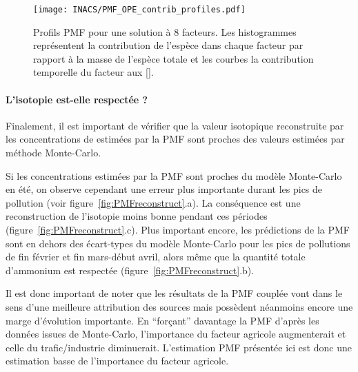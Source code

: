 \begin{figure}[ht]
    \centering
    \texttt{[image: INACS/PMF\_OPE\_contrib\_profiles.pdf]}
    \caption{
        Profils PMF pour une solution à 8 facteurs. Les histogrammes représentent la
        contribution de l'espèce dans chaque facteur par rapport à la masse de l'espèce
        totale et les courbes la contribution temporelle du facteur aux \PMdc{} [\si{\ugm}].
    }
    \label{fig:PMF}
\end{figure}

\paragraph{L'isotopie est-elle respectée ?}%
\label{par:l_isotopie_est_elle_respectée_}

Finalement, il est important de vérifier que la valeur isotopique reconstruite par les
concentrations de \NHq{} estimées par la PMF sont proches des valeurs estimées par méthode
Monte-Carlo.

Si les concentrations estimées par la PMF sont proches du modèle Monte-Carlo en été, on
observe cependant une erreur plus importante durant les pics de pollution (voir
figure~\ref{fig:PMFreconstruct}.a).
La conséquence est une reconstruction de l'isotopie moins bonne pendant ces périodes
(figure~\ref{fig:PMFreconstruct}.c).
Plus important encore, les prédictions de la PMF sont en dehors des écart-types du modèle
Monte-Carlo pour les pics de pollutions de fin février et fin mars-début avril, alors même
que la quantité totale d'ammonium est respectée (figure~\ref{fig:PMFreconstruct}.b).

Il est donc important de noter que les résultats de la PMF couplée vont dans le sens d'une
meilleure attribution des sources mais possèdent néanmoins encore une marge d'évolution
importante.
En ``forçant'' davantage la PMF d'après les données issues de Monte-Carlo,
l'importance du facteur agricole augmenterait et celle du trafic/industrie diminuerait.
L'estimation PMF présentée ici est donc une estimation basse de l'importance du facteur
agricole.


